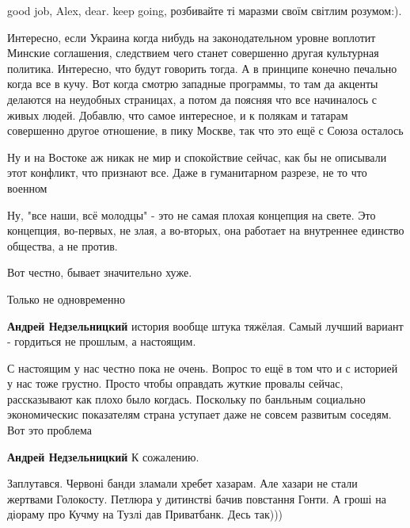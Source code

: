 \begin{itemize}

good job, Alex, dear. keep going, розбивайте ті маразми своїм світлим
розумом:).


Интересно, если Украина когда нибудь на законодательном уровне воплотит Минские
соглашения, следствием чего станет совершенно другая культурная политика.
Интересно, что будут говорить тогда. А в принципе конечно печально когда все в
кучу. Вот когда смотрю западные программы, то там да акценты делаются на
неудобных страницах, а потом да поясняя что все начиналось с живых людей.
Добавлю, что самое интересное, и к полякам и татарам совершенно другое
отношение, в пику Москве, так что это ещё с Союза осталось


Ну и на Востоке аж никак не мир и спокойствие сейчас, как бы не описывали этот
конфликт, что признают все. Даже в гуманитарном разрезе, не то что военном


Ну, "все наши, всё молодцы" - это не самая плохая концепция на свете. Это
концепция, во-первых, не злая, а во-вторых, она работает на внутреннее единство
общества, а не против.

Вот честно, бывает значительно хуже.

\begin{itemize} %
Только не одновременно

\textbf{Андрей Недзельницкий} история вообще штука тяжёлая. Самый лучший вариант - гордиться не прошлым, а настоящим.


С настоящим у нас честно пока не очень. Вопрос то ещё в том что и с историей у
нас тоже грустно. Просто чтобы оправдать жуткие провалы сейчас, рассказывают
как плохо было когдась. Поскольку по банльным социально экономическис
показателям страна уступает даже не совсем развитым соседям. Вот это проблема

\textbf{Андрей Недзельницкий} К сожалению.

\end{itemize} %


Заплутався. Червоні банди зламали хребет хазарам. Але хазари не стали жертвами
Голокосту. Петлюра у дитинстві бачив повстання Гонти. А гроші на діораму про
Кучму на Тузлі дав Приватбанк. Десь так)))


\end{itemize}
